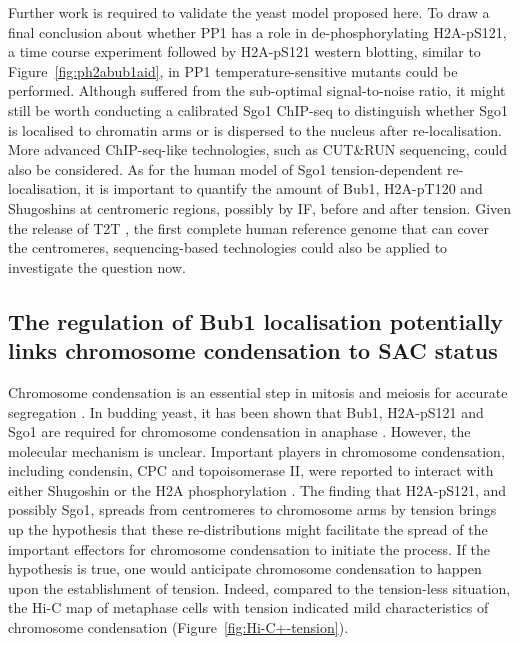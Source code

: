 Further work is required to validate the yeast model proposed here. To draw a final conclusion about whether PP1 has a role in de-phosphorylating H2A-pS121, a time course experiment followed by H2A-pS121 western blotting, similar to Figure~\ref{fig:ph2abub1aid}, in PP1 temperature-sensitive mutants could be performed. Although suffered from the sub-optimal signal-to-noise ratio, it might still be worth conducting a calibrated Sgo1 ChIP-seq to distinguish whether Sgo1 is localised to chromatin arms or is dispersed to the nucleus after re-localisation. More advanced ChIP-seq-like technologies, such as CUT\&RUN sequencing, could also be considered. As for the human model of Sgo1 tension-dependent re-localisation, it is important to quantify the amount of Bub1, H2A-pT120 and Shugoshins at centromeric regions, possibly by IF, before and after tension. Given the release of T2T \citep{Nurk2022TheGenome}, the first complete human reference genome that can cover the centromeres, sequencing-based technologies could also be applied to investigate the question now. 


\subsection{The regulation of Bub1 localisation potentially links chromosome condensation to SAC status}

Chromosome condensation is an essential step in mitosis and meiosis for accurate segregation \citep{Antonin2016ChromosomeMitosis, Piskadlo2016NovelCondensation, Beseda2020MitoticVariability, Takahashi2019FoldingChromosomes}. In budding yeast, it has been shown that Bub1, H2A-pS121 and Sgo1 are required for chromosome condensation in anaphase \citep{Kruitwagen2018}. However, the molecular mechanism is unclear. Important players in chromosome condensation, including condensin, CPC and topoisomerase II, were reported to interact with either Shugoshin or the H2A phosphorylation \citep{Zhang2020FunctioningMitosis, Verzijlbergen2014, Yahya2020, Abad2022MechanisticCPC}. The finding that H2A-pS121, and possibly Sgo1, spreads from centromeres to chromosome arms by tension brings up the hypothesis that these re-distributions might facilitate the spread of the important effectors for chromosome condensation to initiate the process. If the hypothesis is true, one would anticipate chromosome condensation to happen upon the establishment of tension. Indeed, compared to the tension-less situation, the Hi-C map of metaphase cells with tension indicated mild characteristics of chromosome condensation (Figure~\ref{fig:Hi-C+-tension}). 

